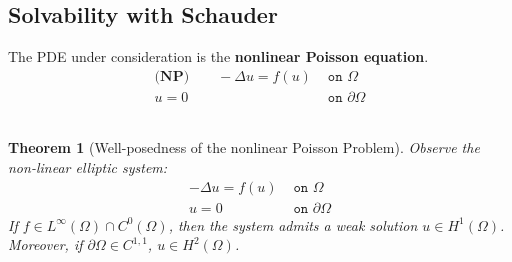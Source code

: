 \documentclass[a4paper,11pt,oneside,fleqn]{book}
\newtheorem{theorem}{Theorem}[section]
\theoremstyle{definition}
\theoremstyle{remark}
\begin{document}
\subsection{Solvability with Schauder}
The PDE under consideration is the \textbf{nonlinear Poisson equation}.       
\begin{align*} 
\textbf{(NP)}\qquad
		- \Delta u = f(u) &\texttt{ on } \Omega\\
		u  = 0 &\texttt{ on } \partial \Omega 
\end{align*}           
\begin{theorem}[Well-posedness of the nonlinear Poisson Problem]
	Observe the non-linear elliptic system:
	\begin{align*}
		- \Delta u = f(u) &\texttt{ on } \Omega\\
		u  = 0 &\texttt{ on } \partial \Omega 
	\end{align*}
	If $f \in L^\infty(\Omega) \cap C^0(\Omega)$, then the system admits a weak solution $u \in H^1(\Omega)$. Moreover, if $\partial\Omega \in C^{1, 1}$, $u \in H^2(\Omega)$.
\end{theorem}
\end{document}
